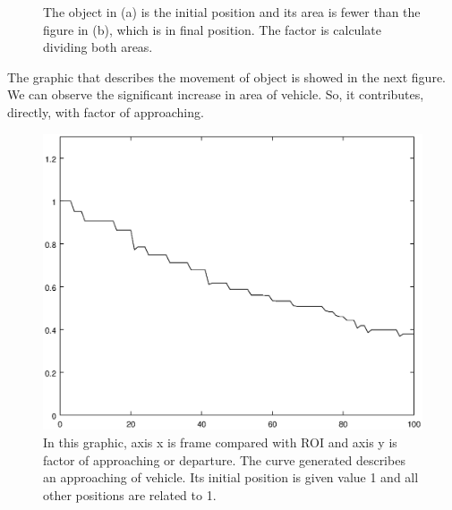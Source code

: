 \begin{figure}[H]
\centering
  \caption{The object in (a) is the initial position and its area is 
  fewer than the figure in (b), which is in final position. 
  The factor is calculate dividing both areas.}
\end{figure}

The graphic that describes the movement of object is showed in the next figure. 
We can observe the significant increase in area of vehicle. So, it 
contributes, directly, with factor of approaching.

\begin{figure}[H]
\includegraphics[width=\columnwidth]{images/graph2.eps}
\caption{In this graphic, axis x is frame compared with ROI and axis y is 
factor of approaching or departure.
The curve generated describes an approaching of vehicle. 
Its initial position is given value 1 and all other positions are related to 1.}
\label{fig:res_graph2}
\end{figure}

